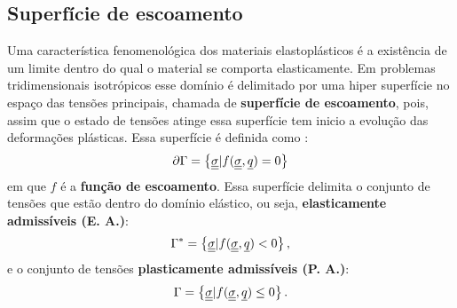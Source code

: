 \subsection{Superfície de escoamento}
Uma característica fenomenológica dos materiais elastoplásticos é a existência de um limite dentro do qual o material se comporta elasticamente. Em problemas tridimensionais isotrópicos esse domínio é delimitado por uma hiper superfície no espaço das tensões principais, chamada de \textbf{superfície de escoamento}, pois, assim que o estado de tensões atinge essa superfície tem inicio a evolução das deformações plásticas. Essa superfície é definida como \cite[p. 150]{Neto2008}:
\begin{equation}
	\label{eq:superficie_escoamento}
	\partial \Gamma = \left\{ \underline{\underline \sigma} | f(\underline{\underline \sigma},\underline q) = 0 \right\}
\end{equation}
em que $f$ é a \textbf{função de escoamento}. Essa superfície delimita o conjunto de tensões que estão dentro do domínio elástico, ou seja, \textbf{elasticamente admissíveis (E. A.)}:
\begin{equation}
	\label{eq:dominio_elasticamente_admissivel}
	\Gamma^* = \left\{ \underline{\underline \sigma} | f(\underline{\underline \sigma},\underline q) < 0 \right\},
\end{equation}
e o conjunto de tensões \textbf{plasticamente admissíveis (P. A.)}:
\begin{equation}
	\label{eq:dominio_plasticamente_admissivel}
	\Gamma = \left\{ \underline{\underline \sigma} | f(\underline{\underline \sigma},\underline q) \le 0 \right\}.
\end{equation}

